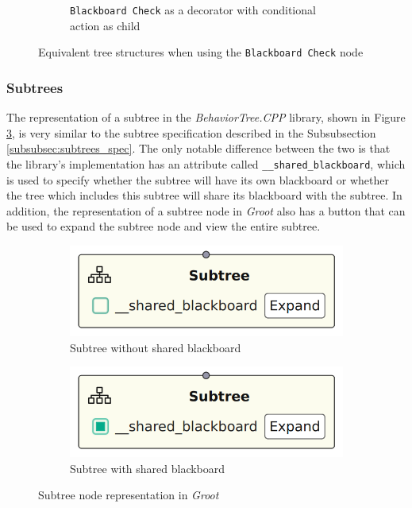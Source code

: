 \begin{figure}[!h]
\begin{subfigure}[b]{.49\linewidth}
        \caption{\texttt{Blackboard Check} as a decorator with conditional action as child}
        \label{fig:blackboard_check_eq_action_as_child}
    \end{subfigure}
    \caption{Equivalent tree structures when using the \texttt{Blackboard Check} node}
    \label{fig:blackboard_check_equivalences}
\end{figure}

\subsubsection{Subtrees}

The representation of a subtree in the \textit{BehaviorTree.CPP} library, shown in Figure \ref{fig:subtrees_impl}, is very similar to the subtree specification described in the Subsubsection \ref{subsubsec:subtrees_spec}. The only notable difference between the two is that the library's implementation has an attribute called \texttt{\_\_shared\_blackboard}, which is used to specify whether the subtree will have its own blackboard or whether the tree which includes this subtree will share its blackboard with the subtree. In addition, the representation of a subtree node in \textit{Groot} also has a button that can be used to expand the subtree node and view the entire subtree.

\begin{figure}[!h]
    \centering
    \begin{subfigure}[b]{.49\linewidth}
        \centering
        \includegraphics[width=0.6\linewidth]{images/implementation/SubtreeNode - Not Shared BB.png}
        \caption{Subtree without shared blackboard}
    \end{subfigure}
    \hfill
    \begin{subfigure}[b]{.49\linewidth}
        \centering
        \includegraphics[width=0.6\linewidth]{images/implementation/SubtreeNode - Shared BB.png}
        \caption{Subtree with shared blackboard}
    \end{subfigure}
    \caption{Subtree node representation in \textit{Groot}}
    \label{fig:subtrees_impl}
\end{figure}

